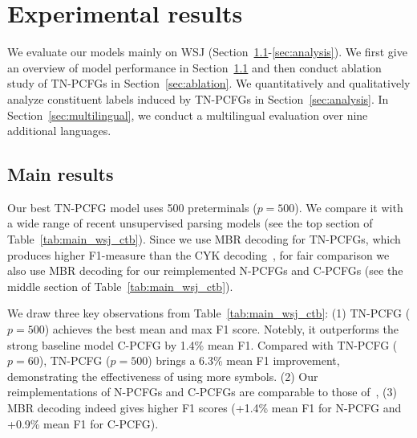\documentclass[11pt]{article}
\begin{document}
\begin{table}[h!]\small  
{\setlength{\tabcolsep}{0.4em}
		}
	\caption{\label{tab:time}Average running time per epoch and the parameter number of each model.}
\end{table}









\section{Experimental results}

We evaluate our models mainly on WSJ (Section~\ref{sec:wsj}-\ref{sec:analysis}).
We first give an overview of model performance in Section~\ref{sec:wsj}
and then conduct ablation study of TN-PCFGs in Section~\ref{sec:ablation}.
We quantitatively and qualitatively analyze constituent labels induced by TN-PCFGs in Section~\ref{sec:analysis}.
In Section~\ref{sec:multilingual}, we conduct a multilingual evaluation over nine additional languages.

\subsection{Main results}\label{sec:wsj}
Our best TN-PCFG model uses 500 preterminals ($p=500$).
We compare it with a wide range of recent unsupervised parsing models (see the top section of Table~\ref{tab:main_wsj_ctb}).
Since we use MBR decoding for TN-PCFGs,
which produces higher F1-measure than the CYK decoding~\citep{goodman-1996-parsing},
for fair comparison we also use MBR decoding for our reimplemented N-PCFGs and C-PCFGs (see the middle section of Table~\ref{tab:main_wsj_ctb}).

We draw three key observations from Table~\ref{tab:main_wsj_ctb}:
(1) TN-PCFG ($p=500$) achieves the best mean and max F1 score. 
Notebly, it outperforms the strong baseline model C-PCFG by 1.4\% mean F1.
Compared with TN-PCFG ($p=60$),
TN-PCFG ($p=500$) brings a 6.3\% mean F1 improvement,
demonstrating the effectiveness of using more symbols.
(2) Our reimplementations of N-PCFGs and C-PCFGs are comparable to those of~\citet{kim-etal-2019-compound}, 
(3) MBR decoding indeed gives higher F1 scores (+1.4\% mean F1 for N-PCFG and +0.9\% mean F1 for C-PCFG).
\end{document}
